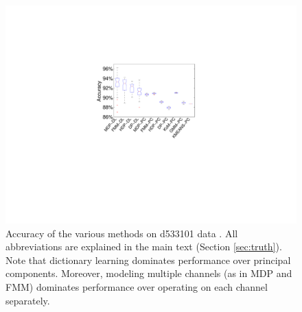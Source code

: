 \documentclass[journal]{IEEEtran}
\begin{document}
\begin{figure}[h!]
  \centering
    \includegraphics[width=1.0\linewidth]{figs_new/Accuracy_hc_1.pdf}
    \caption{{{ Accuracy of the various methods on d533101 data \cite{Henze2000}. All abbreviations are explained in the main text (Section \ref{sec:truth}).  Note that dictionary learning dominates performance over principal components.  Moreover, modeling multiple channels (as in MDP and FMM) dominates performance over operating on each channel separately.   
}}} \vspace{-10pt}
\label{fig:Accuracy_hc_1}
\end{figure}
\end{document}

